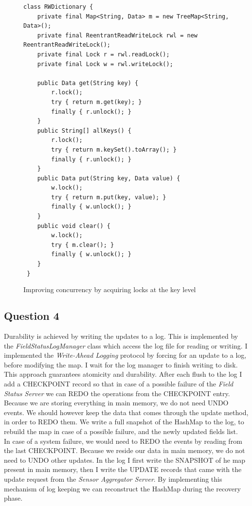 \documentclass{article}      %
\begin{document}
\begin{figure}[htbp]
\begin{center}
\begin{lstlisting}
class RWDictionary {
    private final Map<String, Data> m = new TreeMap<String, Data>();
    private final ReentrantReadWriteLock rwl = new ReentrantReadWriteLock();
    private final Lock r = rwl.readLock();
    private final Lock w = rwl.writeLock();

    public Data get(String key) {
        r.lock();
        try { return m.get(key); }
        finally { r.unlock(); }
    }
    public String[] allKeys() {
        r.lock();
        try { return m.keySet().toArray(); }
        finally { r.unlock(); }
    }
    public Data put(String key, Data value) {
        w.lock();
        try { return m.put(key, value); }
        finally { w.unlock(); }
    }
    public void clear() {
        w.lock();
        try { m.clear(); }
        finally { w.unlock(); }
    }
 }
\end{lstlisting}
\caption{Improving concurrency by acquiring locks at the key level}
\label{Improving concurrency by acquiring locks at the key level}
\end{center}
\end{figure}



\subsection* {Question 4}

Durability is achieved by writing the updates to a log. This is implemented by the \emph{FieldStatusLogManager} class which access the log file for reading or writing. I implemented the \emph{Write-Ahead Logging} protocol by forcing for an update to a log, before modifying the map. I wait for the log manager to finish writing to disk. This approach guarantees atomicity and durability. After each flush to the log I add a CHECKPOINT record so that in case of a possible failure of the \emph{Field Status Server} we can REDO the operations from the CHECKPOINT entry. Because we are storing everything in main memory, we do not need UNDO events. We should however keep the data that comes through the update method, in order to REDO them. We write a full snapshot of the HashMap to the log, to rebuild the map in case of a possible failure, and the newly updated fields list.\\

In case of a system failure, we would need to REDO the events by reading from the last CHECKPOINT. Because we reside our data in main memory, we do not need to UNDO other updates. In the log I first write the SNAPSHOT of he map present in main memory, then I write the UPDATE records that came with the update request from the \emph{Sensor Aggregator Server}. By implementing this mechanism of log keeping we can reconstruct the HashMap during the recovery phase. \\
\end{document}
